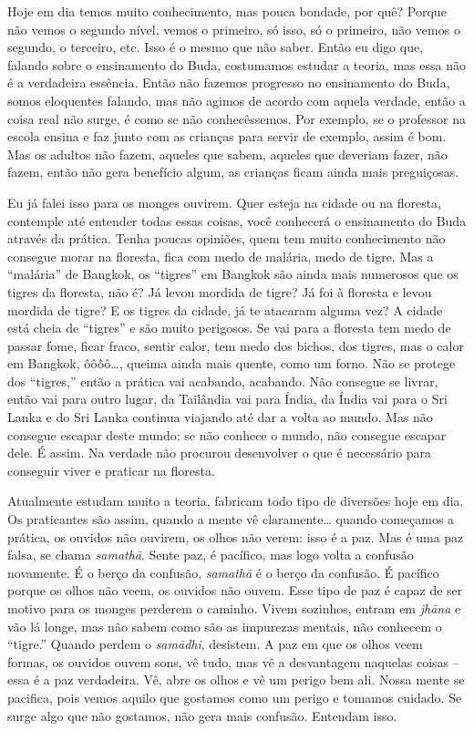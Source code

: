 Hoje em dia temos muito conhecimento, mas pouca bondade, por quê?
Porque não vemos o segundo nível, vemos o primeiro, só isso, só o
primeiro, não vemos o segundo, o terceiro, etc. Isso é o mesmo que não
saber. Então eu digo que, falando sobre o ensinamento do Buda,
costumamos estudar a teoria, mas essa não é a verdadeira essência.
Então não fazemos progresso no ensinamento do Buda, somos eloquentes
falando, mas não agimos de acordo com aquela verdade, então a coisa
real não surge, é como se não conhecêssemos. Por exemplo, se o
professor na escola ensina e faz junto com as crianças para servir de
exemplo, assim é bom. Mas os adultos não fazem, aqueles que sabem,
aqueles que deveriam fazer, não fazem, então não gera benefício algum,
as crianças ficam ainda mais preguiçosas. 

Eu já falei isso para os monges ouvirem. Quer esteja na cidade ou na
floresta, contemple até entender todas essas coisas, você conhecerá o
ensinamento do Buda através da prática. Tenha poucas opiniões, quem tem
muito conhecimento não consegue morar na floresta, fica com medo de
malária, medo de tigre. Mas a “malária” de Bangkok, os “tigres” em
Bangkok são ainda mais numerosos que os tigres da floresta, não é? Já
levou mordida de tigre? Já foi à floresta e levou mordida de tigre? E
os tigres da cidade, já te atacaram alguma vez? A cidade está cheia de
“tigres” e são muito perigosos. Se vai para a floresta tem medo de
passar fome, ficar fraco, sentir calor, tem medo dos bichos, dos
tigres, mas o calor em Bangkok, ôôôô\ldots{}, queima ainda mais quente, como
um forno. Não se protege dos “tigres,” então a prática vai acabando,
acabando. Não consegue se livrar, então vai para outro lugar, da
Tailândia vai para Índia, da Índia vai para o Sri Lanka e do Sri Lanka
continua viajando até dar a volta ao mundo. Mas não consegue escapar
deste mundo: se não conhece o mundo, não consegue escapar dele. É
assim. Na verdade não procurou desenvolver o que é necessário para
conseguir viver e praticar na floresta.

Atualmente estudam muito a teoria, fabricam todo tipo de diversões
hoje em dia. Os praticantes são assim, quando a mente vê claramente\ldots{}
quando começamos a prática, os ouvidos não ouvirem, os olhos não verem:
isso é a paz. Mas é uma paz falsa, se chama \textit{samathā}. Sente
paz, é pacífico, mas logo volta a confusão novamente. É o berço da
confusão, \textit{samathā} é o berço da confusão. É pacífico porque
os olhos não veem, os ouvidos não ouvem. Esse tipo de paz é capaz de
ser motivo para os monges perderem o caminho. Vivem sozinhos, entram em
\textit{jhāna} e vão lá longe, mas não sabem como são as impurezas
mentais, não conhecem o “tigre.” Quando perdem o \textit{samādhi},
desistem. A paz em que os olhos veem formas, os ouvidos ouvem sons, vê
tudo, mas vê a desvantagem naquelas coisas – essa é a paz verdadeira.
Vê, abre os olhos e vê um perigo bem ali. Nossa mente se pacifica, pois
vemos aquilo que gostamos como um perigo e tomamos cuidado. Se surge
algo que não gostamos, não gera mais confusão. Entendam isso. 

